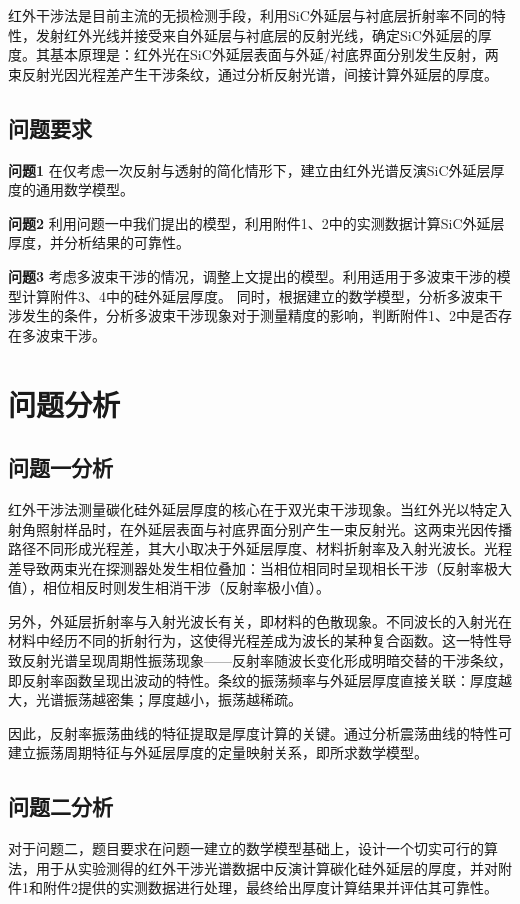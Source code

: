 \documentclass[withoutpreface,bwprint]{cumcmthesis}
\begin{document}
红外干涉法是目前主流的无损检测手段，利用SiC外延层与衬底层折射率不同的特性，发射红外光线并接受来自外延层与衬底层的反射光线，确定SiC外延层的厚度。其基本原理是：红外光在SiC外延层表面与外延/衬底界面分别发生反射，两束反射光因光程差产生干涉条纹，通过分析反射光谱，间接计算外延层的厚度。

\subsection{问题要求}

\textbf{问题1}  
在仅考虑一次反射与透射的简化情形下，建立由红外光谱反演SiC外延层厚度的通用数学模型。

\textbf{问题2}  
利用问题一中我们提出的模型，利用附件1、2中的实测数据计算SiC外延层厚度，并分析结果的可靠性。

\textbf{问题3} 
考虑多波束干涉的情况，调整上文提出的模型。利用适用于多波束干涉的模型计算附件3、4中的硅外延层厚度。
同时，根据建立的数学模型，分析多波束干涉发生的条件，分析多波束干涉现象对于测量精度的影响，判断附件1、2中是否存在多波束干涉。

\section{问题分析}
\subsection{问题一分析}
红外干涉法测量碳化硅外延层厚度的核心在于双光束干涉现象。当红外光以特定入射角照射样品时，在外延层表面与衬底界面分别产生一束反射光。这两束光因传播路径不同形成光程差，其大小取决于外延层厚度、材料折射率及入射光波长。光程差导致两束光在探测器处发生相位叠加：当相位相同时呈现相长干涉（反射率极大值），相位相反时则发生相消干涉（反射率极小值）。

另外，外延层折射率与入射光波长有关，即材料的色散现象。不同波长的入射光在材料中经历不同的折射行为，这使得光程差成为波长的某种复合函数。这一特性导致反射光谱呈现周期性振荡现象——反射率随波长变化形成明暗交替的干涉条纹，即反射率函数呈现出波动的特性。条纹的振荡频率与外延层厚度直接关联：厚度越大，光谱振荡越密集；厚度越小，振荡越稀疏。

因此，反射率振荡曲线的特征提取是厚度计算的关键。通过分析震荡曲线的特性可建立振荡周期特征与外延层厚度的定量映射关系，即所求数学模型。

\subsection{问题二分析}	
对于问题二，题目要求在问题一建立的数学模型基础上，设计一个切实可行的算法，用于从实验测得的红外干涉光谱数据中反演计算碳化硅外延层的厚度，并对附件1和附件2提供的实测数据进行处理，最终给出厚度计算结果并评估其可靠性。
\end{document}
